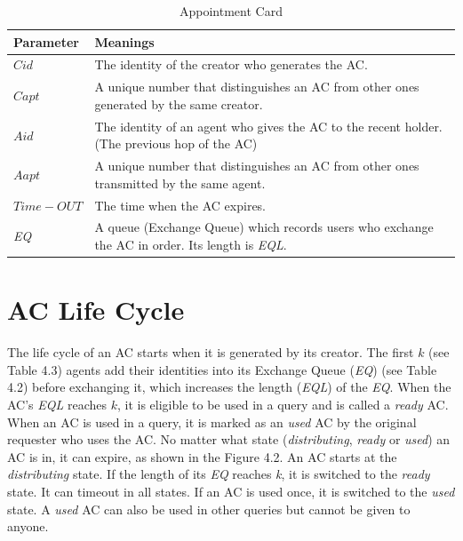\begin{table} [hbtp]
\caption{Appointment Card}
\label{table:AptCard}
\centering
\tabulinesep=2mm
\begin{tabu} to 140 mm {|X[1,c]|X[4,l]|} \hline 
Parameter & Meanings \\ \hline 
$Cid$ & The identity of the creator who generates the AC.  \\ \hline 
$Capt$ & A unique number that distinguishes an AC from other ones generated by the same creator.   \\ \hline 
$Aid$ & The identity of an agent who gives the AC to the recent holder. (The previous hop of the AC)  \\ \hline 
$Aapt$ &  A unique number that distinguishes an AC from other ones transmitted by the same agent. \\ \hline 
$Time-OUT$ & The time when the AC expires.  \\ \hline 
\textit{EQ} & A queue (Exchange Queue) which records users who exchange the AC in order. Its length is \textit{EQL}.  \\ \hline 
\end{tabu}
\end{table}


\section{ AC Life Cycle}

\noindent The life cycle of an AC starts when it is generated by its creator. The first $k$ (see Table 4.3) agents add their identities into its Exchange Queue (\textit{EQ}) (see Table 4.2) before exchanging it, which increases the length (\textit{EQL}) of the \textit{EQ}. When the AC's \textit{EQL} reaches $k$, it is eligible to be used in a query and is called a \textit{ready }AC. When an AC is used in a query, it is marked as an \textit{used} AC by the original requester who uses the AC. No matter what state (\textit{distributing}, \textit{ready} or \textit{used}) an AC is in, it can expire, as shown in the Figure 4.2. An AC starts at the \textit{distributing} state. If the length of its \textit{EQ} reaches \textit{k}, it is switched to the \textit{ready} state. It can timeout in all states. If an AC is used once, it is switched to the \textit{used} state. A \textit{used} AC can also be used in other queries but cannot be given to anyone. 

